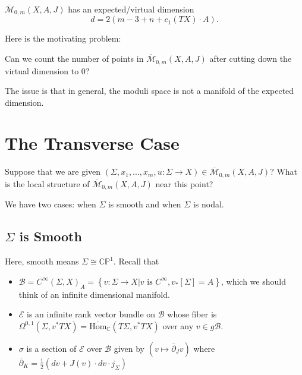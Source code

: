 \begin{theorem}

$\overline{\mathcal{M}}_{0,m} (X,A,J)$ has an expected/virtual dimension
\[
d=2(m-3+n+c_1(TX)\cdot A).
\]

\end{theorem}

Here is the motivating problem:

\begin{problem}

Can we count the number of points in $\overline{\mathcal{M}}_{0,m} (X,A,J)$ after cutting down the virtual dimension to $0$?

\end{problem}

The issue is that in general, the moduli space is not a manifold of the expected dimension.

\section{The Transverse Case}

\begin{problem}

Suppose that we are given $(\Sigma, x_1,...,x_m, u: \Sigma \to X) \in \overline{\mathcal{M}}_{0,m} (X,A,J)$? What is the local structure of $\overline{\mathcal{M}}_{0,m} (X,A,J)$ near this point?

\end{problem}

We have two cases: when $\Sigma$ is smooth and when $\Sigma$ is nodal.

\subsection{$\Sigma$ is Smooth}

Here, smooth means $\Sigma \cong \mathbb{CP}^1$. Recall that
\begin{itemize}
\item $\mathcal{B}=C^\infty (\Sigma, X)_A=\left\{ v:\Sigma \to X | v \text{ is }C^\infty, v_*[\Sigma]=A \right\}$, which we should think of an infinite dimensional manifold.
\item $\mathcal{E}$ is an infinite rank vector bundle on $\mathcal{B}$ whose fiber is $\Omega^{0,1}(\Sigma, v^*TX) = \overline{\text{Hom}}_{\mathbb{C}}(T\Sigma, v^*TX)$ over any $v\in  g\mathcal{B}$.
\item $\sigma$ is a section of $\mathcal{E}$ over $\mathcal{B}$ given by $\left(v\mapsto \overline{\partial}_J v\right)$ where $\overline{\partial}_K = \frac{1}{2} (dv+J(v)\cdot dv \cdot j_\Sigma)$
\end{itemize}

